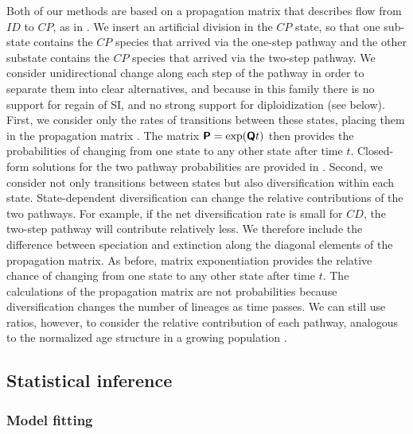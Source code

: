 Both of our methods are based on a propagation matrix that describes flow from $ID$ to $CP$, as in \citet{robertson_2011}.
We insert an artificial division in the $CP$ state, so that one sub-state contains the $CP$ species that arrived via the one-step pathway and the other substate contains the $CP$ species that arrived via the two-step pathway.
We consider unidirectional change along each step of the pathway in order to separate them into clear alternatives, and because in this family there is no support for regain of SI, and no strong support for diploidization (see below).
First, we consider only the rates of transitions between these states, placing them in the propagation matrix .
The matrix $\bm{\mathsf{P}} = \exp(\bm{\mathsf{Q}} t)$ then provides the probabilities of changing from one state to any other state after time $t$.
Closed-form solutions for the two pathway probabilities are provided in \citet{robertson_2011}.
Second, we consider not only transitions between states but also diversification within each state.
State-dependent diversification can change the relative contributions of the two pathways.
For example, if the net diversification rate is small for $CD$, the two-step pathway will contribute relatively less.
We therefore include the difference between speciation and extinction along the diagonal elements of the propagation matrix.
As before, matrix exponentiation provides the relative chance of changing from one state to any other state after time $t$.
The calculations of the propagation matrix are not probabilities because diversification changes the number of lineages as time passes. 
We can still use ratios, however, to consider the relative contribution of each pathway, analogous to the normalized age structure in a growing population \citep{leslie_1945}.

\subsection{Statistical inference}

\subsubsection{Model fitting}

